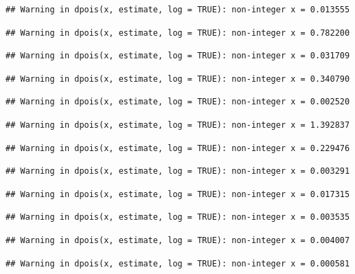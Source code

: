 \documentclass[]{article}
\begin{document}
\begin{verbatim}
## Warning in dpois(x, estimate, log = TRUE): non-integer x = 0.013555
\end{verbatim}

\begin{verbatim}
## Warning in dpois(x, estimate, log = TRUE): non-integer x = 0.782200
\end{verbatim}

\begin{verbatim}
## Warning in dpois(x, estimate, log = TRUE): non-integer x = 0.031709
\end{verbatim}

\begin{verbatim}
## Warning in dpois(x, estimate, log = TRUE): non-integer x = 0.340790
\end{verbatim}

\begin{verbatim}
## Warning in dpois(x, estimate, log = TRUE): non-integer x = 0.002520
\end{verbatim}

\begin{verbatim}
## Warning in dpois(x, estimate, log = TRUE): non-integer x = 1.392837
\end{verbatim}

\begin{verbatim}
## Warning in dpois(x, estimate, log = TRUE): non-integer x = 0.229476
\end{verbatim}

\begin{verbatim}
## Warning in dpois(x, estimate, log = TRUE): non-integer x = 0.003291
\end{verbatim}

\begin{verbatim}
## Warning in dpois(x, estimate, log = TRUE): non-integer x = 0.017315
\end{verbatim}

\begin{verbatim}
## Warning in dpois(x, estimate, log = TRUE): non-integer x = 0.003535
\end{verbatim}

\begin{verbatim}
## Warning in dpois(x, estimate, log = TRUE): non-integer x = 0.004007
\end{verbatim}

\begin{verbatim}
## Warning in dpois(x, estimate, log = TRUE): non-integer x = 0.000581
\end{verbatim}
\end{document}
